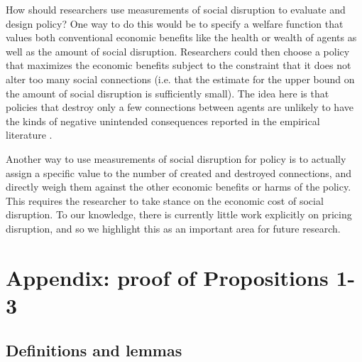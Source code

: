 \documentclass[12pt]{article}
\renewcommand{\baselinestretch}{1.5}
\theoremstyle{definition}
\begin{document}
How should researchers use measurements of social disruption to evaluate and design policy? One way to do this would be to specify a welfare function that values both conventional economic benefits like the health or wealth of agents as well as the amount of social disruption. Researchers could then choose a policy that maximizes the economic benefits subject to the constraint that it does not alter too many social connections (i.e. that the estimate for the upper bound on the amount of social disruption is sufficiently small). The idea here is that policies that destroy only a few connections between agents are unlikely to have the kinds of negative unintended consequences reported in the empirical literature \citep[see][for a recent review]{jackson2021inequality}. 

Another way to use measurements of social disruption for policy is to actually assign a specific value to the number of created and destroyed connections, and directly weigh them against the other economic benefits or harms of the policy. This requires the researcher to take stance on the economic cost of social disruption. To our knowledge, there is currently little work explicitly on pricing disruption, and so we highlight this as an important area for future research. 



\renewcommand{\baselinestretch}{1}


\renewcommand{\baselinestretch}{1.5}

\appendix


\section{Appendix: proof of Propositions 1-3}
\subsection{Definitions and lemmas}
\end{document}
